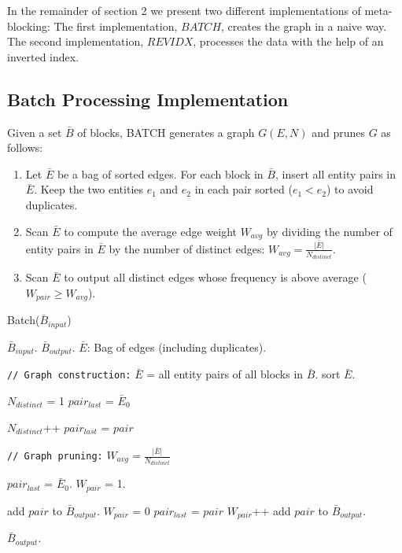 \documentclass[a4paper,12pt]{article}
\begin{document}
In the remainder of section 2 we present two different implementations of meta-blocking: The first implementation, $BATCH$, creates the graph in a naive way. The second implementation, $REVIDX$, processes the data with the help of an inverted index.

\subsection{Batch Processing Implementation}
Given a set $\bar B$ of blocks, BATCH generates a graph $G(E, N)$ and prunes $G$ as follows:
\begin{enumerate}
  \item Let $\bar E$ be a bag of sorted edges. For each block in $\bar B$, insert all entity pairs in $\bar E$. Keep the two entities $e_{1}$ and $e_{2}$ in each pair sorted ($e_{1} < e_{2}$) to avoid duplicates.
  \item Scan $\bar E$ to compute the average edge weight $W_{avg}$ by dividing the number of entity pairs in $\bar E$ by the number of distinct edges: $W_{avg} = \frac{\lvert \bar E \rvert}{N_{distinct}}$.
  \item Scan $\bar E$ to output all distinct edges whose frequency is above average ($W_{pair} \geq W_{avg}$).
\end{enumerate}

\begin{algorithm}[H]
\caption{{\sc Batch($\bar B_{input}$)}}
\begin{algorithmic}
\REQUIRE $\bar B_{input}$.
\ENSURE $\bar B_{output}$.
\STATE $\bar E$: Bag of edges (including duplicates).

\STATE \texttt{// Graph construction:}
\STATE $\bar E$ = all entity pairs of all blocks in $\bar B$.
\STATE sort $\bar E$.

\STATE $N_{distinct}$ = 1
\STATE $pair_{last}$ = $\bar E_{0}$

    \STATE $N_{distinct}$++
    \STATE $pair_{last}$ = $pair$
  \ENDIF
\ENDFOR

\STATE \texttt{// Graph pruning:}
\STATE $W_{avg} = \frac{\lvert \bar E \rvert}{N_{distinct}}$

\STATE $pair_{last}$ = $\bar E_{0}$.
\STATE $W_{pair}$ = 1.

      \STATE add $pair$ to $\bar B_{output}$.
    \ENDIF
    \STATE $W_{pair}$ = 0
    \STATE $pair_{last}$ = $pair$
  \ENDIF
  \STATE $W_{pair}$++
\ENDFOR
{}
  \STATE add $pair$ to $\bar B_{output}$.
\ENDIF

\RETURN $\bar B_{output}$. \\

\end{algorithmic}
\end{algorithm}
\end{document}
